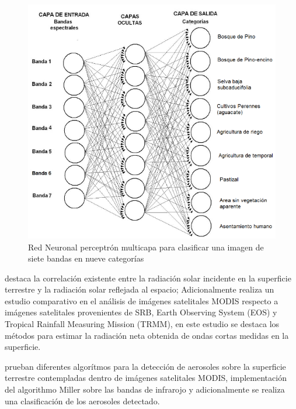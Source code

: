 \begin{figure}[htb]
  \centering 
  \includegraphics[scale=0.6]{pictures/ER7.png}
  \caption{ Red Neuronal perceptrón multicapa para clasificar una imagen de siete bandas en nueve categorías} 
  \label{fig:er7}
\end{figure}
\newpage
\textbf{\cite{kim2008estimation}} destaca la correlación existente entre la radiación solar incidente en la superficie terrestre y la radiación solar reflejada al espacio; Adicionalmente 
realiza un estudio comparativo en el análisis de  imágenes satelitales MODIS respecto a imágenes satelitales provenientes de SRB, Earth Observing System
(EOS) y Tropical Rainfall Measuring Mission (TRMM), en este estudio se destaca los métodos para estimar la radiación neta obtenida de ondas cortas 
medidas en la superficie.

\newpage
\textbf{\cite{alvarezprocesamiento}} prueban diferentes algorítmos para la detección de aerosoles sobre la superficie terrestre contempladas dentro de imágenes 
satelitales MODIS, implementación del algorithmo Miller sobre las bandas de infrarojo y adicionalmente se realiza una clasificación de los aerosoles detectado.

